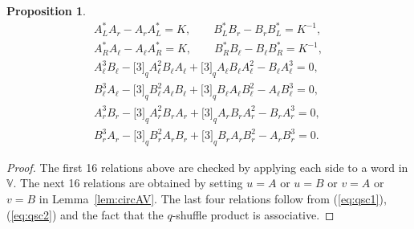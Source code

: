 \documentclass[pdftex]{sigma}
\numberwithin{equation}{section}
\newtheorem{Proposition}[Theorem]{Proposition}
 { \theoremstyle{definition}
\newtheorem{Definition}[Theorem]{Definition}
\newtheorem{Example}[Theorem]{Example}
\newtheorem{Note}[Theorem]{Note}
}
\begin{document}
\begin{Proposition}
\begin{gather*}
A^*_L A_r - A_r A^*_L = K,\qquad B^*_L B_r - B_r B^*_L = K^{-1},\\
A^*_R A_\ell - A_\ell A^*_R = K,\qquad B^*_R B_\ell - B_\ell B^*_R = K^{-1},\\
A_\ell^3 B_\ell- \lbrack 3 \rbrack_q A_\ell^2 B_\ell A_\ell+
\lbrack 3 \rbrack_q A_\ell B_\ell A^2_\ell-B_\ell A^3_\ell = 0,\\
B_\ell^3 A_\ell-\lbrack 3 \rbrack_q B_\ell^2 A_\ell B_\ell+
\lbrack 3 \rbrack_q B_\ell A_\ell B^2_\ell-A_\ell B^3_\ell = 0,\\
A_r^3 B_r-\lbrack 3 \rbrack_q A_r^2 B_r A_r+\lbrack 3 \rbrack_q A_r B_r A^2_r-B_r A^3_r = 0,\\
B_r^3 A_r-\lbrack 3 \rbrack_q B_r^2 A_r B_r+\lbrack 3 \rbrack_q B_r A_r B^2_r-A_r B^3_r = 0.
\end{gather*}
\end{Proposition}
\begin{proof}The first 16 relations above are checked by applying each side to a word in $\mathbb V$. The next 16 relations are obtained by setting $u=A$ or $u=B$ or $v=A$ or $v=B$ in Lemma~\ref{lem:circAV}. The last four relations follow from (\ref{eq:qsc1}), (\ref{eq:qsc2}) and the fact that the $q$-shuffle product
is associative.
\end{proof}
\end{document}
